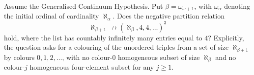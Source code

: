 Assume the Generalised Continuum Hypothesis. Put $\beta=\omega_{\omega+1}$, with $\omega_\alpha$ denoting the initial ordinal of cardinality $\aleph_\alpha$. Does the negative partition relation
\[\aleph_{\beta+1}\not\longrightarrow(\aleph_\beta,4,4,\ldots)^3\]
hold, where the list has countably infinitely many entries equal to $4$? Explicitly, the question asks for a colouring of the unordered triples from a set of size $\aleph_{\beta+1}$ by colours $0,1,2,\ldots$, with no colour-$0$ homogeneous subset of size $\aleph_\beta$ and no colour-$j$ homogeneous four-element subset for any $j\geq1$.

